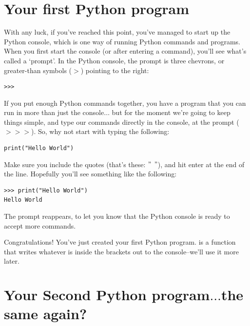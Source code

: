 \section{Your first Python program}

With any luck, if you've reached this point, you've managed to start up the Python console, which is one way of running Python commands and programs.  When you first start the console (or after entering a command), you'll see what's called a `prompt'.  In the Python console, the prompt is three chevrons, or greater-than symbols ($>$) pointing to the right:

\begin{listing}
\begin{verbatim}
>>>
\end{verbatim}
\end{listing}

If you put enough Python commands together, you have a program that you can run in more than just the console$\ldots$ but for the moment we're going to keep things simple, and type our commands directly in the console, at the prompt ($>>>$).  So, why not start with typing the following:

\begin{listing}
\begin{verbatim}
print("Hello World")
\end{verbatim}
\end{listing}

Make sure you include the quotes (that's these: $"$ $"$), and hit enter at the end of the line.  Hopefully you'll see something like the following:

\begin{listing}
\begin{verbatim}
>>> print("Hello World")
Hello World
\end{verbatim}
\end{listing}

The prompt reappears, to let you know that the Python console is ready to accept more commands.

\noindent
Congratulations! You've just created your first Python program.   is a function that writes whatever is inside the brackets out to the console--we'll use it more later.

\section{Your Second Python program$\ldots$the same again?}

